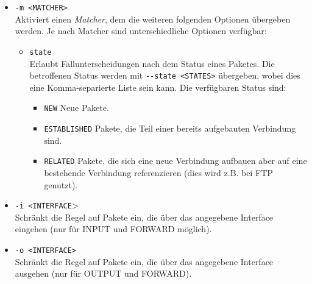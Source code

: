 \documentclass[a4paper, 11pt, accentcolor = tud3b]{tudreport}
\begin{document}
\begin{itemize}
\begin{itemize}
					    	\end{itemize}
				    	\item \texttt{-m <MATCHER>} \\ Aktiviert einen \textit{Matcher}, dem die weiteren folgenden Optionen übergeben werden. Je nach Matcher sind unterschiedliche Optionen verfügbar:
					    	\begin{itemize}
					    		\item \texttt{state} \\ Erlaubt Fallunterscheidungen nach dem Status eines Paketes. Die betroffenen Status werden mit \texttt{-{}-state <STATES>} übergeben, wobei dies eine Komma-separierte Liste sein kann. Die verfügbaren Status sind:
						    		\begin{itemize}
						    			\item \texttt{NEW} \tabto{3cm} Neue Pakete.
						    			\item \texttt{ESTABLISHED} \tabto{3cm} Pakete, die Teil einer bereits aufgebauten Verbindung sind.
						    			\item \texttt{RELATED} \tabto{3cm} Pakete, die sich eine neue Verbindung aufbauen aber auf eine bestehende Verbindung referenzieren (dies wird z.B. bei FTP genutzt).
						    		\end{itemize}
					    	\end{itemize}
				    	\item \texttt{-i <INTERFACE}> \\ Schränkt die Regel auf Pakete ein, die über das angegebene Interface eingehen (nur für INPUT und FORWARD möglich).
				    	\item \texttt{-o <INTERFACE>} \\ Schränkt die Regel auf Pakete ein, die über das angegebene Interface ausgehen (nur für OUTPUT und FORWARD).
				    \end{itemize}
			    
\end{document}

